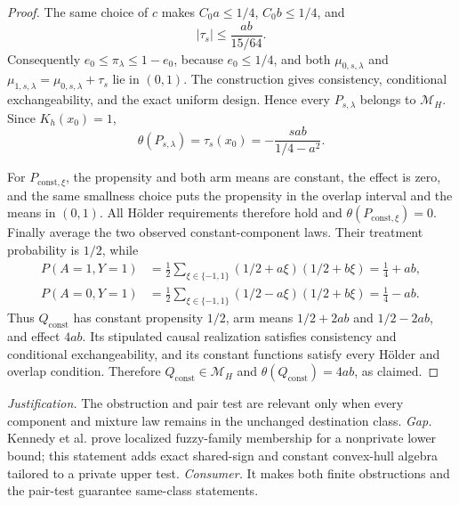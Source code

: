 \documentclass{article}
\begin{document}
\begin{proof}
The same choice of \(c\) makes \(C_0a\le1/4\), \(C_0b\le1/4\), and
\[
 |\tau_s|\le \frac{ab}{15/64}.
\]
Consequently \(e_0\le\pi_\lambda\le1-e_0\), because \(e_0\le1/4\), and both \(\mu_{0,s,\lambda}\) and \(\mu_{1,s,\lambda}=\mu_{0,s,\lambda}+\tau_s\) lie in \((0,1)\).  The construction gives consistency, conditional exchangeability, and the exact uniform design.  Hence every \(P_{s,\lambda}\) belongs to \(\mathcal M_H\).  Since \(K_h(x_0)=1\),
\[
 \theta(P_{s,\lambda})=\tau_s(x_0)
 =-\frac{sab}{1/4-a^2}.
\]

For \(P_{\mathrm{const},\xi}\), the propensity and both arm means are constant, the effect is zero, and the same smallness choice puts the propensity in the overlap interval and the means in \((0,1)\).  All Hölder requirements therefore hold and \(\theta(P_{\mathrm{const},\xi})=0\).  Finally average the two observed constant-component laws.  Their treatment probability is \(1/2\), while
\[
 \begin{aligned}
 P(A=1,Y=1)&=\frac12\sum_{\xi\in\{-1,1\}}
 (1/2+a\xi)(1/2+b\xi)=\frac14+ab,\\
 P(A=0,Y=1)&=\frac12\sum_{\xi\in\{-1,1\}}
 (1/2-a\xi)(1/2+b\xi)=\frac14-ab.
 \end{aligned}
\]
Thus \(Q_{\mathrm{const}}\) has constant propensity \(1/2\), arm means \(1/2+2ab\) and \(1/2-2ab\), and effect \(4ab\).  Its stipulated causal realization satisfies consistency and conditional exchangeability, and its constant functions satisfy every Hölder and overlap condition.  Therefore \(Q_{\mathrm{const}}\in\mathcal M_H\) and \(\theta(Q_{\mathrm{const}})=4ab\), as claimed.
\end{proof}
\par\smallskip\noindent \textit{Justification.} The obstruction and pair test are relevant only when every component and mixture law remains in the unchanged destination class. \textit{Gap.} Kennedy et al. prove localized fuzzy-family membership for a nonprivate lower bound; this statement adds exact shared-sign and constant convex-hull algebra tailored to a private upper test. \textit{Consumer.} It makes both finite obstructions and the pair-test guarantee same-class statements.
\end{document}
